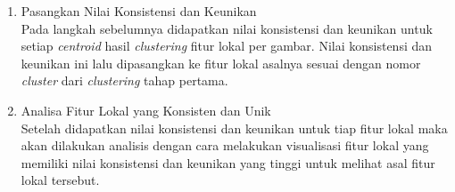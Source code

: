 \begin{enumerate}
	\item Pasangkan Nilai Konsistensi dan Keunikan \\
	Pada langkah sebelumnya didapatkan nilai konsistensi dan keunikan untuk setiap \textit{centroid} hasil \textit{clustering} fitur lokal per gambar. Nilai konsistensi dan keunikan ini lalu dipasangkan ke fitur lokal asalnya sesuai dengan nomor \textit{cluster} dari \textit{clustering} tahap pertama.
	\item Analisa Fitur Lokal yang Konsisten dan Unik \\
	Setelah didapatkan nilai konsistensi dan keunikan untuk tiap fitur lokal maka akan dilakukan analisis dengan cara melakukan visualisasi fitur lokal yang memiliki nilai konsistensi dan keunikan yang tinggi untuk melihat asal fitur lokal tersebut.
\end{enumerate}

